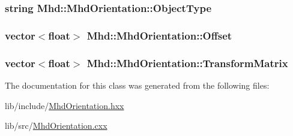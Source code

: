 \hypertarget{classMhd_1_1MhdOrientation_a46fe7ec6720e2e70f938d62e7f11f9f7}{
\subsubsection[{\-Object\-Type}]{\setlength{\rightskip}{0pt plus 5cm}string {\bf \-Mhd\-::\-Mhd\-Orientation\-::\-Object\-Type}}}\label{classMhd_1_1MhdOrientation_a46fe7ec6720e2e70f938d62e7f11f9f7}
\hypertarget{classMhd_1_1MhdOrientation_a07437846f5a5cda783205a628edbcc3f}{
\subsubsection[{\-Offset}]{\setlength{\rightskip}{0pt plus 5cm}vector$<$float$>$ {\bf \-Mhd\-::\-Mhd\-Orientation\-::\-Offset}}}\label{classMhd_1_1MhdOrientation_a07437846f5a5cda783205a628edbcc3f}
\hypertarget{classMhd_1_1MhdOrientation_aa070162e37053f01a4b2b7d51a15df05}{
\subsubsection[{\-Transform\-Matrix}]{\setlength{\rightskip}{0pt plus 5cm}vector$<$float$>$ {\bf \-Mhd\-::\-Mhd\-Orientation\-::\-Transform\-Matrix}}}\label{classMhd_1_1MhdOrientation_aa070162e37053f01a4b2b7d51a15df05}


\-The documentation for this class was generated from the following files\-:\begin{DoxyCompactItemize}
\item 
lib/include/\hyperlink{MhdOrientation_8hxx}{\-Mhd\-Orientation.\-hxx}\item 
lib/src/\hyperlink{MhdOrientation_8cxx}{\-Mhd\-Orientation.\-cxx}\end{DoxyCompactItemize}
